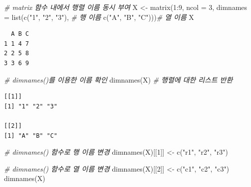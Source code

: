 \documentclass[
  11pt,
]{krantz}
\newenvironment{Shaded}{\begin{snugshade}}{\end{snugshade}}
\newcommand{\AttributeTok}[1]{\textcolor[rgb]{0.61,0.61,0.61}{#1}}
\newcommand{\CommentTok}[1]{\textcolor[rgb]{0.37,0.37,0.37}{\textit{#1}}}
\newcommand{\DecValTok}[1]{\textcolor[rgb]{0.06,0.06,0.06}{#1}}
\newcommand{\FunctionTok}[1]{\textcolor[rgb]{0,0,0}{#1}}
\newcommand{\NormalTok}[1]{#1}
\newcommand{\OtherTok}[1]{\textcolor[rgb]{0.37,0.37,0.37}{#1}}
\newcommand{\SpecialCharTok}[1]{\textcolor[rgb]{0,0,0}{#1}}
\newcommand{\StringTok}[1]{\textcolor[rgb]{0.5,0.5,0.5}{#1}}
\begin{document}
\footnotesize

\begin{Shaded}
\begin{Highlighting}[]
\CommentTok{\# matrix 함수 내에서 행렬 이름 동시 부여}
\NormalTok{X }\OtherTok{\textless{}{-}} \FunctionTok{matrix}\NormalTok{(}\DecValTok{1}\SpecialCharTok{:}\DecValTok{9}\NormalTok{, }\AttributeTok{ncol =} \DecValTok{3}\NormalTok{, }
            \AttributeTok{dimnames =} \FunctionTok{list}\NormalTok{(}\FunctionTok{c}\NormalTok{(}\StringTok{"1"}\NormalTok{, }\StringTok{"2"}\NormalTok{, }\StringTok{"3"}\NormalTok{), }\CommentTok{\# 행 이름}
                            \FunctionTok{c}\NormalTok{(}\StringTok{"A"}\NormalTok{, }\StringTok{"B"}\NormalTok{, }\StringTok{"C"}\NormalTok{)))}\CommentTok{\# 열 이름}
\NormalTok{X}
\end{Highlighting}
\end{Shaded}

\begin{verbatim}
  A B C
1 1 4 7
2 2 5 8
3 3 6 9
\end{verbatim}

\begin{Shaded}
\begin{Highlighting}[]
\CommentTok{\# dimnames()를 이용한 이름 확인}
\FunctionTok{dimnames}\NormalTok{(X) }\CommentTok{\# 행렬에 대한 리스트 반환}
\end{Highlighting}
\end{Shaded}

\begin{verbatim}
[[1]]
[1] "1" "2" "3"

[[2]]
[1] "A" "B" "C"
\end{verbatim}

\begin{Shaded}
\begin{Highlighting}[]
\CommentTok{\# dimnames() 함수로 행 이름 변경}
\FunctionTok{dimnames}\NormalTok{(X)[[}\DecValTok{1}\NormalTok{]] }\OtherTok{\textless{}{-}} \FunctionTok{c}\NormalTok{(}\StringTok{"r1"}\NormalTok{, }\StringTok{"r2"}\NormalTok{, }\StringTok{"r3"}\NormalTok{)}

\CommentTok{\# dimnames() 함수로 열 이름 변경}
\FunctionTok{dimnames}\NormalTok{(X)[[}\DecValTok{2}\NormalTok{]] }\OtherTok{\textless{}{-}} \FunctionTok{c}\NormalTok{(}\StringTok{"c1"}\NormalTok{, }\StringTok{"c2"}\NormalTok{, }\StringTok{"c3"}\NormalTok{)}
\FunctionTok{dimnames}\NormalTok{(X)}
\end{Highlighting}
\end{Shaded}
\end{document}
